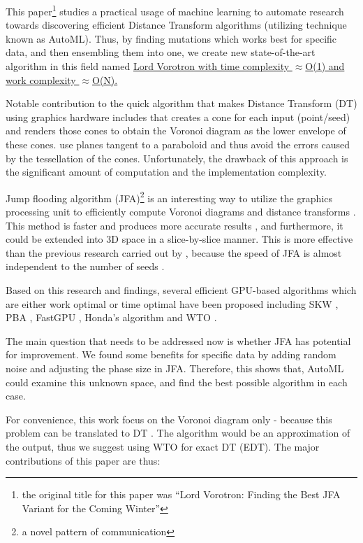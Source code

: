 \documentclass{article}
\newcommand{\citep}[1]{\citeauthor*{#1} \cite{#1}} %
\newcommand{\ourjfa}{Lord Vorotron} %
\begin{document}
This paper\footnote{the original title for this paper was ``Lord Vorotron:
Finding the Best JFA Variant for the Coming Winter''} studies a practical usage of machine learning to automate research
towards discovering efficient Distance Transform algorithms (utilizing technique known as AutoML).
Thus, by finding mutations which works best for specific data, and then ensembling them into
one, we create new state-of-the-art algorithm in this field named \uline{\ourjfa \hspace{0.01cm} with
time complexity $\approx$O(1) and work complexity $\approx$O(N).}

Notable contribution to the quick algorithm that makes Distance Transform (DT)
using graphics hardware includes \citep{hoff1999fast} that creates a cone for
each input (point/seed) and renders those cones to obtain the Voronoi diagram as the lower envelope of these cones.
\cite{fischer2006fast} use planes tangent to a paraboloid and thus avoid the errors caused by the tessellation of the cones.
Unfortunately, the drawback of this approach is the significant amount of computation and the implementation complexity.

Jump flooding algorithm (JFA)\footnote{a novel pattern of
communication} is an interesting way to utilize the graphics processing unit to
efficiently compute Voronoi diagrams and distance transforms
\cite{rong2006jump}. This method is faster and produces more accurate results
\cite{rong2007variants}, and furthermore, it could be extended into 3D space in a slice-by-slice manner.
This is more effective than the previous research carried out by
\citep{sud2006interactive}, because the speed of JFA is almost independent to the number of seeds \cite{rong2007variants}.

Based on this research and findings, several efficient GPU-based algorithms which are either
work optimal or time optimal have been proposed including
SKW \cite{schneider2009gpu}, PBA \cite{cao2010parallel}, FastGPU \cite{de2017fast}, Honda's algorithm \cite{honda2017simple} and
WTO \cite{manduhu2019work}.

The main question that needs to be addressed now is whether JFA has potential
for improvement. We found some benefits for specific data by adding random noise
and adjusting the phase size in JFA. Therefore, this shows that, AutoML could examine this
unknown space, and find the best possible algorithm in each case.

For convenience, this work focus on the Voronoi diagram only - because this problem can be translated to DT \cite{rong2006jump}.
The algorithm would be an approximation of the output, thus we suggest using WTO
\cite{manduhu2019work} for exact DT (EDT). The major contributions of this paper are thus:
\end{document}

